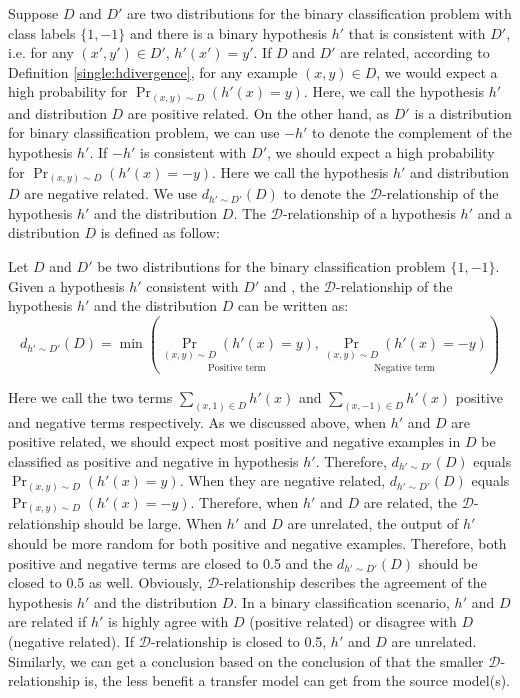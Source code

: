 Suppose $D$ and $D'$ are two distributions for the binary classification problem with class labels $\{1,-1\}$ and there is a binary hypothesis $h'$ that is consistent with $D'$, i.e. for any $(x',y') \in D'$, $h'(x')=y'$.
If $D$ and $D'$ are related, according to Definition \ref{single:hdivergence}, for any example $(x,y) \in D$, we would expect a high probability for $\Pr_{(x,y)\sim D}(h'(x)=y)$. Here, we call the hypothesis $h'$ and distribution $D$ are positive related. On the other hand, as $D'$ is a distribution for binary classification problem, we can use $-h'$ to denote the complement of the hypothesis $h'$. If $-h'$ is consistent with $D'$, we should expect a high probability for $\Pr_{(x,y)\sim D}(h'(x)=-y)$. Here we call the hypothesis $h'$ and distribution $D$ are negative related. We use $d_{h'\sim D'}(D)$ to denote the $\mathcal{D}$-relationship of the hypothesis $h'$ and the distribution $D$. The $\mathcal{D}$-relationship of a hypothesis $h'$ and a distribution $D$ is defined as follow:
\begin{defi}\label{single:drelation}
Let $D$ and $D'$ be two distributions for the binary classification problem $\{1,-1\}$. Given a hypothesis $h'$ consistent with $D'$ and , the $\mathcal{D}$-relationship of the hypothesis $h'$ and the distribution $D$ can be written as:
\begin{equation*}
{d_{h'\sim D'}}(D) = \min \left(\underset{\text{Positive term}}{\Pr_{(x,y)\sim D}(h'(x)=y)} , \underset{\text{Negative term}} {\Pr_{(x,y)\sim D}(h'(x)=-y)}\right)
\end{equation*}
\end{defi}
Here we call the two terms $ {\sum_{(x,1) \in D} {h'(x)} } $ and ${\sum_{(x, - 1) \in D} {h'(x)} } $ positive and negative terms respectively.
As we discussed above, when $h'$ and $D$ are positive related, we should expect most positive and negative examples in $D$ be classified as positive and negative in hypothesis $h'$. Therefore, ${d_{h'\sim D'}}(D)$ equals $\Pr_{(x,y)\sim D}(h'(x)=y)$. When they are negative related,  ${d_{h'\sim D'}}(D)$ equals $\Pr_{(x,y)\sim D}(h'(x)=-y)$. Therefore, when $h'$ and $D$ are related, the $\mathcal{D}$-relationship should be large. When $h'$ and $D$ are unrelated, the output of $h'$ should be more random for both positive and negative examples. Therefore, both positive and negative terms are closed to 0.5 and the ${d_{h'\sim D'}}(D)$ should be closed to 0.5 as well. Obviously, $\mathcal{D}$-relationship describes the agreement of the hypothesis $h'$ and the distribution $D$. In a binary classification scenario, $h'$ and $D$ are related if $h'$ is highly agree with $D$ (positive related) or disagree with $D$ (negative related). If $\mathcal{D}$-relationship is closed to 0.5, $h'$ and $D$ are unrelated. Similarly, we can get a conclusion based on the conclusion of \cite{ben2010theory} that the smaller $\mathcal{D}$-relationship is, the less benefit a transfer model can get from the source model(s).

